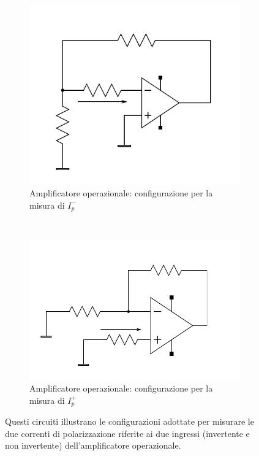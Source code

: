 \begin{figure}[H]
        \centering
        \begin{subfigure}[b]{0.45\textwidth}
                \includegraphics[width=\textwidth]{../figure/Ip_minus.pdf}
                \caption{Amplificatore operazionale: configurazione per la misura di $I_{p}^-$}
                \label{fig:ip_minus}
        \end{subfigure}
        ~
        \begin{subfigure}[b]{0.45\textwidth}
                \includegraphics[width=\textwidth]{../figure/Ip_plus.pdf}
                \caption{Amplificatore operazionale: configurazione per la misura di $I_{p}^+$}
                \label{fig:ip_plus}
        \end{subfigure}
        \caption{Questi circuiti illustrano le configurazioni adottate per misurare le due correnti di polarizzazione riferite ai due ingressi (invertente e non invertente) dell'amplificatore operazionale.}
        \label{fig:circuits}
\end{figure}

